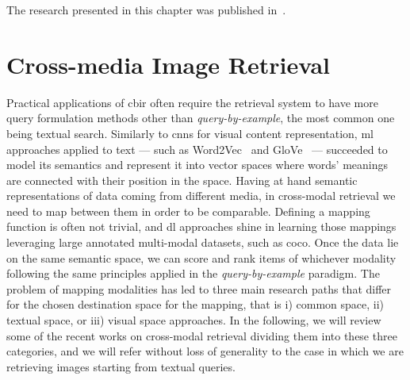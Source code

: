 The research presented in this chapter was published in~\cite{carrara2016picture,carrara2018picture}.


\section{Cross-media Image Retrieval}
\label{sec:t2v:related}

Practical applications of \gls{cbir} often require the retrieval system to have more query formulation methods other than \emph{query-by-example}, the most common one being textual search.
Similarly to \glspl{cnn} for visual content representation, \gls{ml} approaches applied to text --- such as Word2Vec~\cite{mikolov2013distributed} and GloVe~\cite{pennington2014glove} --- succeeded to model its semantics and represent it into vector spaces where words' meanings are connected with their position in the space.
Having at hand semantic representations of data coming from different media, in cross-modal retrieval we need to map between them in order to be comparable.
Defining a mapping function is often not trivial, and \gls{dl} approaches shine in learning those mappings leveraging large annotated multi-modal datasets, such as \gls{coco}.
Once the data lie on the same semantic space, we can score and rank items of whichever modality following the same principles applied in the \emph{query-by-example} paradigm.
The problem of mapping modalities has led to three main research paths that differ for the chosen destination space for the mapping, that is i) common space, ii) textual space, or iii) visual space approaches.
In the following, we will review some of the recent works on cross-modal retrieval dividing them into these three categories, and we will refer without loss of generality to the case in which we are retrieving images starting from textual queries. %

